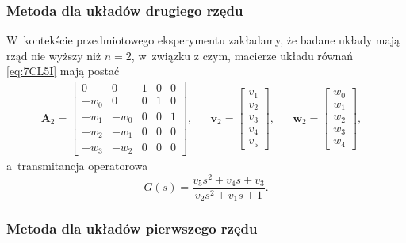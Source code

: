 \documentclass[paper=a4,DIV=12]{lpas}
\begin{document}
\begin{appendices}
  \subsubsection{Metoda dla układów drugiego rzędu}
  \label{eq:7RDBZ}

  W~kontekście przedmiotowego eksperymentu zakładamy, że badane układy mają
  rząd nie wyższy niż $n=2$, w~związku z czym, macierze układu równań
  \eqref{eq:7CL5I} mają postać
  \begin{equation}
    \begin{aligned}
      \mathbf{A}_2 = \begin{bmatrix}
         0    &    0 & 1 & 0 & 0 \\
         -w_0 &    0 & 0 & 1 & 0 \\
         -w_1 & -w_0 & 0 & 0 & 1 \\
         -w_2 & -w_1 & 0 & 0 & 0 \\
         -w_3 & -w_2 & 0 & 0 & 0
      \end{bmatrix}, &
      & \mathbf{v}_2 = \begin{bmatrix}
        v_1 \\ v_2 \\ v_3 \\ v_4 \\ v_5
      \end{bmatrix}, &
      & \mathbf{w}_2 = \begin{bmatrix}
        w_0 \\ w_1 \\  w_2 \\ w_3 \\ w_4
      \end{bmatrix}, &
    \end{aligned}
  \end{equation}
  a~transmitancja operatorowa
  \begin{equation}
    G(s) = \frac{v_5 s^2 + v_4 s + v_3}{v_2 s^2 + v_1 s + 1}.
  \end{equation}

  \subsubsection{Metoda dla układów pierwszego rzędu}
  \label{eq:R5YS1}


\end{appendices}
\end{document}
